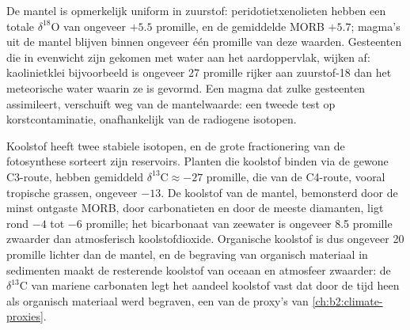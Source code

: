 De mantel is opmerkelijk uniform in zuurstof: peridotietxenolieten hebben een totale
$\delta^{18}\mathrm{O}$ van ongeveer $+5.5$ promille, en de gemiddelde MORB $+5.7$; magma's
uit de mantel blijven binnen ongeveer één promille van deze waarden. Gesteenten die
in evenwicht zijn gekomen met water aan het aardoppervlak, wijken af: kaolinietklei bijvoorbeeld
is ongeveer 27 promille rijker aan zuurstof-18 dan het meteorische water waarin
ze is gevormd. Een magma dat zulke gesteenten assimileert, verschuift weg van de
mantelwaarde: een tweede test op korstcontaminatie, onafhankelijk van de radiogene
isotopen.

Koolstof heeft twee stabiele isotopen, en de grote fractionering van de fotosynthese
sorteert zijn reservoirs. Planten die koolstof binden via de gewone C3-route, hebben gemiddeld
$\delta^{13}\mathrm{C} \approx -27$ promille, die van de C4-route, vooral tropische
grassen, ongeveer $-13$. De koolstof van de mantel, bemonsterd door de minst ontgaste
MORB, door carbonatieten en door de meeste diamanten, ligt rond $-4$ tot $-6$ promille; het
bicarbonaat van zeewater is ongeveer 8.5 promille zwaarder dan atmosferisch
koolstofdioxide. Organische koolstof is dus ongeveer 20 promille lichter dan de mantel, en
de begraving van organisch materiaal in sedimenten maakt de resterende koolstof van
oceaan en atmosfeer zwaarder: de $\delta^{13}\mathrm{C}$ van mariene carbonaten
legt het aandeel koolstof vast dat door de tijd heen als organisch materiaal werd begraven, een van de
proxy's van \cref{ch:b2:climate-proxies}.

\begin{omfigure}
\centering
{}
\par{}
\end{omfigure}

